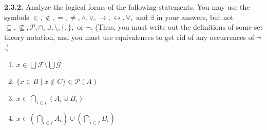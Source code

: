 \documentclass[12pt]{amsart}
\newenvironment{statement}[1]{\smallskip\noindent\color[rgb]{.6627, .3529, .6314} {\bf #1.}}{}
\theoremstyle{definition}
\theoremstyle{remark}
\begin{document}
\begin{statement}{2.3.2}
Analyze the logical forms of the following statements.
You may use the symbols $\in, \notin, =, \neq, \wedge, \vee, \rightarrow, \leftrightarrow,
 \forall, \text{ and } \exists$
in your answers, but not $\subseteq, \nsubseteq, \mathscr{P}, \cap, \cup, \setminus, \{, \},
\text{ or } \neg$.
(Thus, you must write out the definitions of some set theory notation, and you must use
equivalences to get rid of any occurrences of $\neg$.)
\begin{enumerate}
	\item $x \in \bigcup \mathcal{F} \setminus \bigcup \mathcal{G}$
	
	\item $\{ x \in B \mid x \notin C \} \in \mathscr{P}(A)$
	
	\item $x \in \bigcap_{i \in I} (A_i \cup B_i)$
	
	\item $x \in \left( \bigcap_{i \in I} A_i \right) \cup \left( \bigcap_{i \in I} B_i \right)$
\end{enumerate}
\end{statement}
\end{document}
